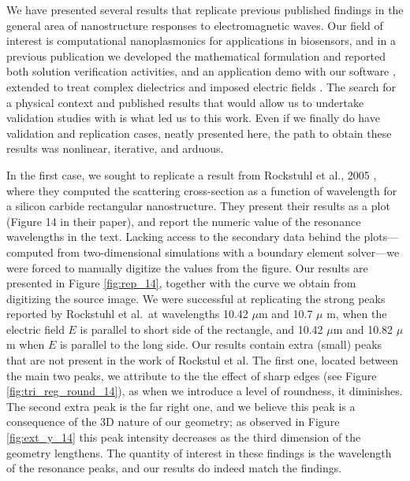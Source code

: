 
We have presented several results that replicate previous published findings in the general area of nanostructure responses to electromagnetic waves. 
Our field of interest is computational nanoplasmonics for applications in biosensors, and in a previous publication we developed the mathematical formulation and reported both solution verification activities, and an application demo with our software \pygbe, extended to treat complex dielectrics and imposed electric fields \cite{ClementiETal2019}.
The search for a physical context and published results that would allow us to undertake validation studies with \pygbe is what led us to this work. 
Even if we finally do have validation and replication cases, neatly presented here, the path to obtain these results was nonlinear, iterative, and arduous.

In the first case, we sought to replicate a result from Rockstuhl et al., 2005 \cite{rockstuhl2005}, where they computed the scattering cross-section as a function of wavelength for a silicon carbide rectangular nanostructure. 
They present their results as a plot (Figure 14 in their paper), and report the numeric value of the resonance wavelengths in the text. 
Lacking access to the secondary data behind the plots---computed from two-dimensional simulations with a boundary element solver---we were forced to manually digitize the values from the figure.
Our results are presented in Figure \ref{fig:rep_14}, together with the curve we obtain from digitizing the source image. 
We were successful at replicating the strong peaks reported  by Rockstuhl et al.\ at wavelengths
10.42 $\mu$m and 10.7 $\mu$ m,  when the electric field $E$ is parallel to short side of the rectangle, and 10.42 $\mu$m and 10.82 $\mu$ m
when $E$ is parallel to the long side. Our results contain extra (small) peaks that are not present in the work of Rockstul et al.
The first one, located between the main two peaks, we attribute to the the effect of
sharp edges (see Figure \ref{fig:tri_reg_round_14}), as when we introduce a level of roundness, it diminishes. The second extra peak is the far right one, and we believe this
peak is a consequence of the 3D nature of our geometry; as observed in Figure \ref{fig:ext_y_14} this peak intensity
decreases as the third dimension of the geometry lengthens.
The quantity of interest in these findings is the wavelength of the resonance peaks, and our results do indeed match the findings.

